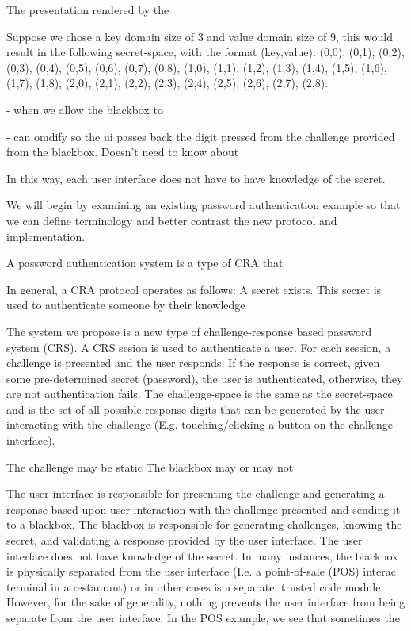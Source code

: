 \documentclass[12pt]{document}
\begin{document}
\begin{Introduction}
\begin{SCRAP -layman}
The presentation rendered by the 


Suppose we chose a key domain size of 3 and value domain size of 9, this would result in the following secret-space, with the format (key,value):
(0,0), (0,1), (0,2), (0,3), (0,4), (0,5), (0,6), (0,7), (0,8),
(1,0), (1,1), (1,2), (1,3), (1,4), (1,5), (1,6), (1,7), (1,8),
(2,0), (2,1), (2,2), (2,3), (2,4), (2,5), (2,6), (2,7), (2,8).


- when we allow the blackbox to 


- can omdify so the ui passes back the digit pressed from the challenge provided from the blackbox. Doesn't need to know about 

In this way, each user interface does not have to have knowledge of the secret.





We will begin by examining an existing password authentication example so that we can define terminology and better contrast the new protocol and implementation.

A password authentication system is a type of CRA that 



In general, a CRA protocol operates as follows:
A secret exists. This secret is used to authenticate someone by their knowledge

The system we propose is a new type of challenge-response based password system (CRS).
A CRS sesion is used to authenticate a user. For each session, a challenge is presented and the user responds. If the response is correct, given some pre-determined secret (password), the user is authenticated, otherwise, they are not authentication fails. The challenge-space is the same as the secret-space and is the set of all possible response-digits that can be generated by the user interacting with the challenge (E.g. touching/clicking a button on the challenge interface). 


The challenge may be static 
The blackbox may or may not 

The user interface is responsible for presenting the challenge and generating a response based upon user interaction with the challenge presented and sending it to a blackbox. The blackbox is responsible for generating challenges, knowing the secret, and validating a response provided by the user interface. The user interface does not have knowledge of the secret. In many instances, the blackbox is physically separated from the user interface (I.e. a point-of-sale (POS) interac terminal in a restaurant) or in other cases is a separate, trusted code module. However, for the sake of generality, nothing prevents the user interface from being separate from the user interface. In the POS example, we see that sometimes the




\end{SCRAP -layman}
\end{Introduction}
\end{document}
